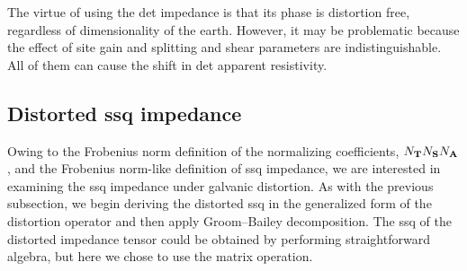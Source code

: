 	The virtue of using the det impedance is that its phase is distortion free, regardless of dimensionality of the earth. However, it may be problematic because the effect of site gain and splitting and shear parameters are indistinguishable. All of them can cause the shift in det apparent resistivity.
	

\subsection{Distorted ssq impedance}

	Owing to the Frobenius norm definition of the normalizing coefficients, $N_{\mathbf{T}}N_{\mathbf{S}}N_{\mathbf{A}}$, and the Frobenius norm-like definition of ssq impedance, we are interested in examining the ssq impedance under galvanic distortion.
	As with the previous subsection, we begin deriving the distorted ssq in the generalized form of the distortion operator and then apply Groom--Bailey decomposition.
	The ssq of the distorted impedance tensor could be obtained by performing straightforward algebra, but here we chose to use the matrix operation.

